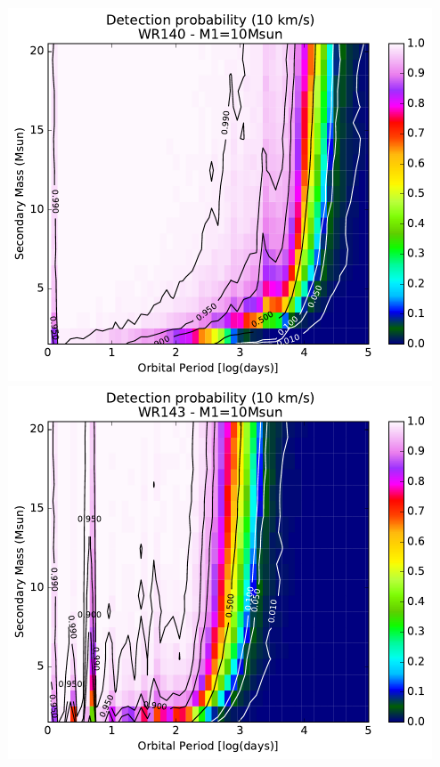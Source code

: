 \begin{figure}[h!]
\begin{minipage}{0.49\textwidth}
    \end{minipage}
    \begin{minipage}{0.49\textwidth}
    \centering
    \includegraphics[width=\textwidth]{chapters/appendix3/image/140PM2_thres10_MAR31.pdf}
    \end{minipage}
    \begin{minipage}{0.49\textwidth}
    \centering
    \includegraphics[width=\textwidth]{chapters/appendix3/image/143PM2_thres10_MAR31.pdf}

\end{minipage}
\end{figure}
